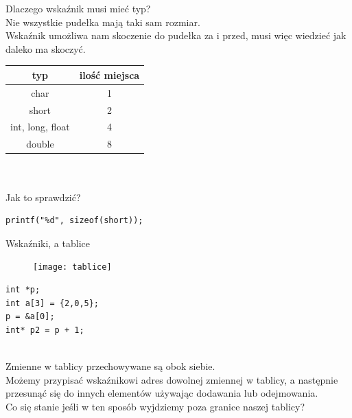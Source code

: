 \documentclass[notheorems, aspectratio=54]{beamer}
\begin{document}
\begin{frame}[fragile]
	Dlaczego wskaźnik musi mieć typ?\\
	Nie wszystkie pudełka mają taki sam rozmiar.\\
	Wskaźnik umożliwa nam skoczenie do pudełka za i przed, musi więc wiedzieć jak daleko ma skoczyć.
	\begin{center}
		\begin{tabular}{ |c |c | }
			\hline
			typ              & ilość miejsca \\ 
			\hline
			char             & 1               \\ 
			short            & 2               \\  
			int, long, float & 4               \\
			double           & 8               \\
			\hline
		\end{tabular}
		~\\~\\
		\flushleft
		Jak to sprawdzić?
		\begin{lstlisting}
printf("%d", sizeof(short));
		\end{lstlisting}
		
	\end{center}
	
\end{frame}

\begin{frame}[fragile]
	Wskaźniki, a tablice
	\center
	\begin{table}[!htb]
		\begin{minipage}{.5\linewidth}
			\begin{figure}
				
				\texttt{[image: tablice]}
			\end{figure}
		\end{minipage}%
		\begin{minipage}{.5\linewidth}
			
			\begin{lstlisting}
int *p;
int a[3] = {2,0,5};
p = &a[0];
int* p2 = p + 1;
			\end{lstlisting}
			~\\
			Zmienne w tablicy przechowywane są obok siebie.\\
			Możemy przypisać wskaźnikowi adres dowolnej zmiennej w tablicy, a następnie przesunąć się do innych elementów używając dodawania lub odejmowania.\\
			Co się stanie jeśli w ten sposób wyjdziemy poza granice naszej tablicy?\\
		\end{minipage} 
	\end{table}
\end{frame}
\end{document}
